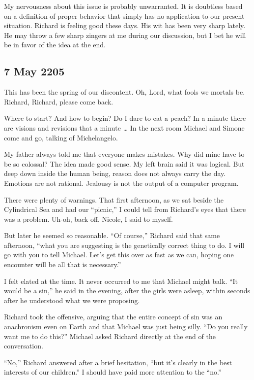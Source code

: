 \documentclass[]{article}
\begin{document}
My nervousness about this issue is probably unwarranted. It is doubtless based on a definition of proper behavior that simply has no application to our present situation. Richard is feeling good these days. His wit has been very sharp lately. He may throw a few sharp zingers at me during our discussion, but I bet he will be in favor of the idea at the end.

\subsection{7 May 2205}

This has been the spring of our discontent. Oh, Lord, what fools we mortals be. Richard, Richard, please come back.

Where to start? And how to begin? Do I dare to eat a peach? In a minute there are visions and revisions that a minute … In the next room Michael and Simone come and go, talking of Michelangelo.

My father always told me that everyone makes mistakes. Why did mine have to be so colossal? The idea made good sense. My left brain said it was logical. But deep down inside the human being, reason does not always carry the day. Emotions are not rational. Jealousy is not the output of a computer program.

There were plenty of warnings. That first afternoon, as we sat beside the Cylindrical Sea and had our “picnic,” I could tell from Richard’s eyes that there was a problem. Uh-oh, back off, Nicole, I said to myself.

But later he seemed so reasonable. “Of course,” Richard said that same afternoon, “what you are suggesting is the genetically correct thing to do. I will go with you to tell Michael. Let’s get this over as fast as we can, hoping one encounter will be all that is necessary.”

I felt elated at the time. It never occurred to me that Michael might balk. “It would be a sin,” he said in the evening, after the girls were asleep, within seconds after he understood what we were proposing.

Richard took the offensive, arguing that the entire concept of sin was an anachronism even on Earth and that Michael was just being silly. “Do you really want me to do this?” Michael asked Richard directly at the end of the conversation.

“No,” Richard answered after a brief hesitation, “but it’s clearly in the best interests of our children.” I should have paid more attention to the “no.”
\end{document}
